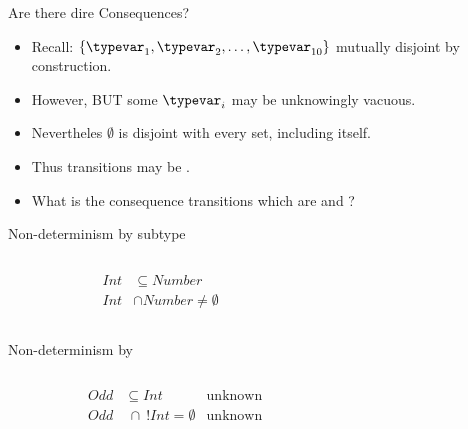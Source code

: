 \begin{frame}{Are there dire Consequences?}

  \begin{itemize}
  \item   Recall: $\{\typevar_1, \typevar_2, \ldots, \typevar_{10}\}$ mutually disjoint by construction.

  \item   However, BUT some $\typevar_i$ may be unknowingly vacuous.

  \item   Nevertheles $\emptyset$ is disjoint with every set, including itself.

  \item   Thus transitions may be .

  \item   What is the consequence transitions which are   and ?


  \end{itemize}


\end{frame}

\begin{frame}{Non-determinism by subtype}
  \begin{columns}[T]
    \begin{column}{0.4\textwidth}
      \centering
      
      \begin{align*}
        Int&\subseteq Number\\
        Int &\cap Number \neq \emptyset
      \end{align*}%
      \scalebox{0.8}{}%
    \end{column}%
    \begin{column}{0.6\textwidth}
    \end{column}
  \end{columns}
\end{frame}


\begin{frame}{Non-determinism by }
  \begin{columns}[T]
    \begin{column}{0.35\textwidth}
      \centering
      \begin{align*}
        Odd&\subseteq Int &\text{unknown}\\
        Odd&~\cap~ !Int = \emptyset &\text{unknown}
      \end{align*}
      \scalebox{1.0}{}%
    \end{column}%
    \begin{column}{0.7\textwidth}
    \end{column}
  \end{columns}
\end{frame}




